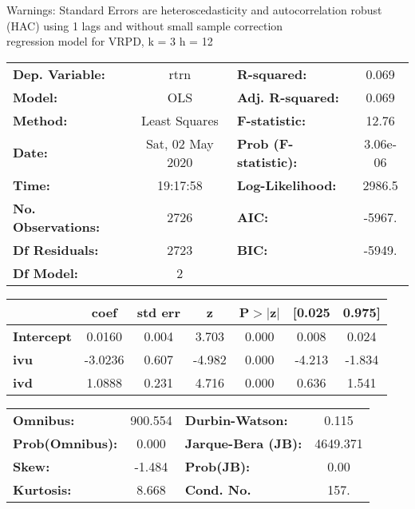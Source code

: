 Warnings: \newline
 [1] Standard Errors are heteroscedasticity and autocorrelation robust (HAC) using 1 lags and without small sample correction\\ 

regression model for VRPD, k = 3 h = 12\begin{center}
\begin{tabular}{lclc}
\toprule
\textbf{Dep. Variable:}    &       rtrn       & \textbf{  R-squared:         } &     0.069   \\
\textbf{Model:}            &       OLS        & \textbf{  Adj. R-squared:    } &     0.069   \\
\textbf{Method:}           &  Least Squares   & \textbf{  F-statistic:       } &     12.76   \\
\textbf{Date:}             & Sat, 02 May 2020 & \textbf{  Prob (F-statistic):} &  3.06e-06   \\
\textbf{Time:}             &     19:17:58     & \textbf{  Log-Likelihood:    } &    2986.5   \\
\textbf{No. Observations:} &        2726      & \textbf{  AIC:               } &    -5967.   \\
\textbf{Df Residuals:}     &        2723      & \textbf{  BIC:               } &    -5949.   \\
\textbf{Df Model:}         &           2      & \textbf{                     } &             \\
\bottomrule
\end{tabular}
\begin{tabular}{lcccccc}
                   & \textbf{coef} & \textbf{std err} & \textbf{z} & \textbf{P$> |$z$|$} & \textbf{[0.025} & \textbf{0.975]}  \\
\midrule
\textbf{Intercept} &       0.0160  &        0.004     &     3.703  &         0.000        &        0.008    &        0.024     \\
\textbf{ivu}       &      -3.0236  &        0.607     &    -4.982  &         0.000        &       -4.213    &       -1.834     \\
\textbf{ivd}       &       1.0888  &        0.231     &     4.716  &         0.000        &        0.636    &        1.541     \\
\bottomrule
\end{tabular}
\begin{tabular}{lclc}
\textbf{Omnibus:}       & 900.554 & \textbf{  Durbin-Watson:     } &    0.115  \\
\textbf{Prob(Omnibus):} &   0.000 & \textbf{  Jarque-Bera (JB):  } & 4649.371  \\
\textbf{Skew:}          &  -1.484 & \textbf{  Prob(JB):          } &     0.00  \\
\textbf{Kurtosis:}      &   8.668 & \textbf{  Cond. No.          } &     157.  \\
\bottomrule
\end{tabular}
\end{center}

